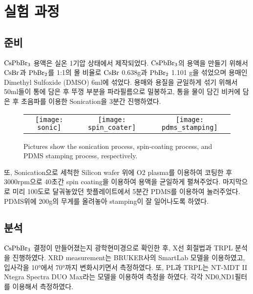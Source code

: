 \section{실험 과정}

\subsection{준비}
$\rm{CsPbBr_3}$ 용액은 실온 1기압 상태에서 제작되었다. $\rm{CsPbBr_3}$의 용액을 만들기 위해서 $\rm{CsBr}$과 $\rm{PbBr_2}$를 1:1의 몰 비율로 $\rm{CsBr}$ 0.638g과 $\rm{PbBr_2}$ 1.101 g을 섞었으며 용매인 Dimethyl Sulfoxide (DMSO) 6ml에 섞었다. 용매와 용질을 균일하게 섞기 위해서 50ml들이 통에 담은 후 뚜껑 부분을 파라필름으로 밀봉하고, 통을 물이 담긴 비커에 담은 후 초음파를 이용한 Sonication을 3분간 진행하였다. 
\begin{figure}[h!]
	\begin{center}
		\begin{tabular}{ccc}
			\texttt{[image: sonic]} &   \texttt{[image: spin\_coater]} &
			\texttt{[image: pdms\_stamping]}
		\end{tabular}
		\caption{Pictures show the sonication process, spin-coating process, and PDMS stamping process, respectively.}	
		\label{fig:FIR221}
	\end{center}
\end{figure}
또, Sonication으로 세척한 Silicon wafer 위에 O2 plasma를 이용하여 코팅한 후 3000rpm으로 40초간 spin coating을 이용하여 용액을 균일하게 펼쳐주었다. 마지막으로 미리 100도로 달궈놓았던 핫플레이트에서 5분간 PDMS를 이용하여 눌러주었다. PDMS위에 200g의 무게를 올려놓아 stamping이 잘 일어나도록 하였다. 

\subsection{분석}
$\rm{CsPbBr_3}$ 결정이 만들어졌는지 광학현미경으로 확인한 후, X선 회절법과 TRPL 분석을 진행하였다. XRD measurement는 BRUKER사의 SmartLab 모델을 이용하였고, 입사각을 10°에서 70°까지 변화시키면서 측정하였다. 또, PL과 TRPL는 NT-MDT II Ntegra Spectra DUO Max라는 모델을 이용하여 측정을 하였다. 각각 ND0,ND1필터를 이용해서 측정하였다.
